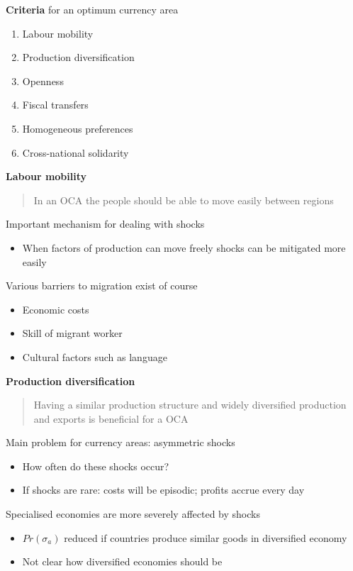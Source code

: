 \documentclass{beamer}
\begin{document}
\begin{frame}
 \textbf{Criteria} for an optimum currency area  
  \begin{enumerate}
    \item Labour mobility
    \item Production diversification
    \item Openness
    \item Fiscal transfers
    \item Homogeneous preferences
    \item Cross-national solidarity
  \end{enumerate}  
\end{frame}

\begin{frame}
  \textbf{Labour mobility} 
  \begin{quote}
    In an OCA the people should be able to move easily between regions
  \end{quote}
  \medskip
  Important mechanism for dealing with shocks  
  \begin{itemize}
    \item When factors of production can move freely shocks can be mitigated more easily
  \end{itemize}
  \medskip
  Various barriers to migration exist of course
  \begin{itemize}
    \item Economic costs
    \item Skill of migrant worker
    \item Cultural factors such as language    
  \end{itemize}
\end{frame}

\begin{frame}
  \textbf{Production diversification}
  \begin{quote}
    Having a similar production structure and widely diversified production and exports is beneficial for a OCA
  \end{quote}
  \medskip
  Main problem for currency areas: asymmetric shocks
  \begin{itemize}
    \item How often do these shocks occur?
    \item If shocks are rare: costs will be episodic; profits accrue every day    
  \end{itemize}
  \medskip
    Specialised economies are more severely affected by shocks
  \begin{itemize}
    \item $Pr(\sigma_a)$ reduced if countries produce similar goods in diversified economy
    \item Not clear how diversified economies should be
  \end{itemize}
\end{frame}
\end{document}
